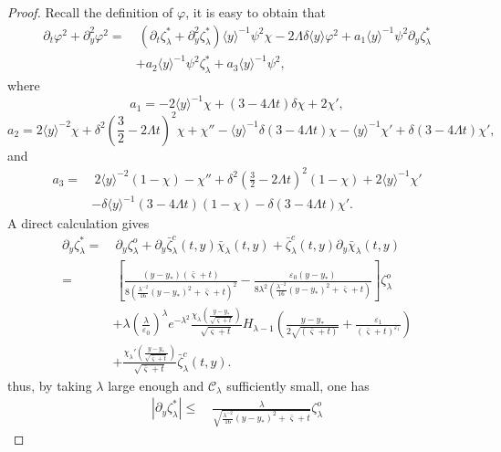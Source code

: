 \documentclass{amsart}
\numberwithin{equation}{section}
\newcommand\y{{{\langle y \rangle}}}
\begin{document}
\begin{proof}
Recall the definition of $\varphi$, it is easy to obtain that
\begin{align}\label{varphity}
\partial_{t}\varphi^{2}+\partial_{y}^{2}\varphi^{2}
=&~\left(\partial_{t}\zeta_{\lambda}^{*}+\partial_{y}^{2}\zeta_{\lambda}^{*}\right)\y^{-1}\psi^{2}\chi
  -2\Lambda\delta\y\varphi^{2}
  +a_{1}\y^{-1}\psi^{2}\partial_{y}\zeta_{\lambda}^{*}\\
 &+a_{2}\y^{-1}\psi^{2}\zeta_{\lambda}^{*}
  +a_{3}\y^{-1}\psi^{2},\nonumber
\end{align}
where
$$a_{1}=-2\y^{-1}\chi+\left(3-4\Lambda t\right)\delta\chi+2\chi',$$
$$a_{2}=2\y^{-2}\chi+\delta^{2}\left(\frac{3}{2}-2\Lambda t\right)^{2}\chi
         +\chi''-\y^{-1}\delta\left(3-4\Lambda t\right)\chi
         -\y^{-1}\chi'
         +\delta\left(3-4\Lambda t\right)\chi',$$
and
\begin{align*}
a_{3}=&~2\y^{-2}(1-\chi)-\chi''+\delta^{2}\left(\frac{3}{2}-2\Lambda t\right)^{2}(1-\chi)+2\y^{-1}\chi'\\
      &-\delta\y^{-1}\left(3-4\Lambda t\right)(1-\chi)
       -\delta\left(3-4\Lambda t\right)\chi'.
\end{align*}
A direct calculation gives
\begin{align*}
\partial_{y}\zeta_{\lambda}^{*}
=&~\partial_{y}\zeta_{\lambda}^{o}
 +\partial_{y}\bar{\zeta}_{\lambda}^{c}(t,y)\bar{\chi}_{\lambda}(t,y)
 +\bar{\zeta}_{\lambda}^{c}(t,y)\partial_{y}\bar{\chi}_{\lambda}(t,y)\\
=&~\left[\frac{(y-y_{*})(\bar{\varsigma}+t)}{8(\frac{\lambda^{-2}}{16}(y-y_{*})^{2}+\bar{\varsigma}+t)^{2}}
         -\frac{\varepsilon_{0}(y-y_{*})}{8\lambda^{2}(\frac{\lambda^{-2}}{16}(y-y_{*})^{2}+\bar{\varsigma}+t)}\right]\zeta_{\lambda}^{o}\\
 &+\lambda\left(\frac{\lambda}{\varepsilon_{0}}\right)^{\lambda}e^{-\lambda^{2}}\frac{\chi_{\lambda}\left(\frac{y-y_{*}}{\sqrt{\bar{\varsigma}+t}}\right)}{\sqrt{\bar{\varsigma}+t}}
   H_{\lambda-1}\left(\frac{y-y_{*}}{2\sqrt{(\bar{\varsigma}+t)}}+\frac{\varepsilon_{1}}{(\bar{\varsigma}+t)^{\varepsilon_{1}}}\right)\nonumber\\
 &+\frac{\chi_{\lambda}'\left(\frac{y-y_{*}}{\sqrt{\bar{\varsigma}+t}}\right)}{\sqrt{\bar{\varsigma}+t}}\bar{\zeta}_{\lambda}^{c}(t,y).\nonumber
\end{align*}
thus, by taking $\lambda$ large enough and $\mathcal{C}_{\lambda}$ sufficiently small, one has
\begin{align}\label{zeta*y}
|\partial_{y}\zeta_{\lambda}^{*}|
\leq&~\frac{\lambda}{\sqrt{\frac{\lambda^{-2}}{16}(y-y_{*})^{2}+\bar{\varsigma}+t}}\zeta_{\lambda}^{o}

\end{align}
\end{proof}
\end{document}
